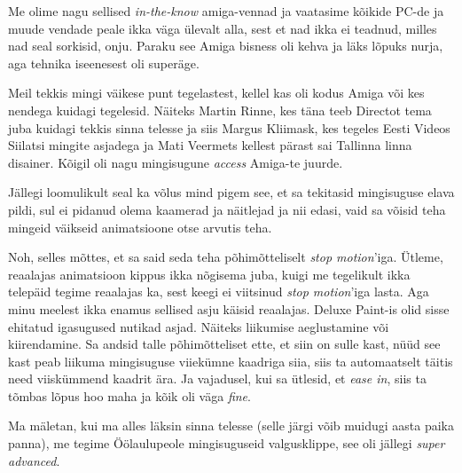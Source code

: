 Me olime nagu sellised \emph{in-the-know} amiga-vennad ja vaatasime  kõikide 
PC-de  ja muude vendade peale ikka väga ülevalt alla, sest et nad ikka ei 
teadnud, milles nad seal sorkisid, onju. Paraku see Amiga bisness oli kehva ja 
läks lõpuks nurja, aga tehnika iseenesest oli superäge. 

Meil tekkis mingi väikese punt tegelastest, kellel kas oli kodus Amiga või kes 
nendega kuidagi tegelesid. Näiteks Martin Rinne, kes 
täna teeb Directot tema juba kuidagi tekkis  sinna telesse ja 
siis Margus Kliimask, kes tegeles Eesti 
Videos Siilatsi mingite asjadega ja Mati 
Veermets kellest pärast sai Tallinna linna disainer. 
 Kõigil oli nagu mingisugune \emph{access} Amiga-te juurde. 

Jällegi loomulikult seal ka võlus mind pigem see, et sa tekitasid mingisuguse 
elava pildi, sul ei  pidanud olema kaamerad ja näitlejad ja nii edasi, vaid sa 
võisid teha mingeid väikseid animatsioone otse arvutis teha.


Noh, selles mõttes, et sa said seda teha põhimõtteliselt \emph{stop 
motion}'iga. Ütleme,  reaalajas animatsioon kippus ikka nõgisema juba, kuigi me 
tegelikult ikka telepäid tegime reaalajas ka, sest keegi ei viitsinud 
\emph{stop motion}'iga lasta. Aga minu meelest ikka enamus sellised asju käisid 
reaalajas. Deluxe Paint-is olid sisse ehitatud igasugused 
nutikad asjad. Näiteks  liikumise aeglustamine või kiirendamine. Sa andsid 
talle põhimõtteliset ette, et siin on sulle kast, nüüd see kast peab liikuma 
mingisuguse viiekümne kaadriga siia, siis ta automaatselt täitis need 
viiskümmend kaadrit ära. Ja vajadusel, kui sa ütlesid, et \emph{ease in}, siis 
ta tõmbas lõpus hoo maha ja kõik oli väga \emph{fine}.  

Ma mäletan, kui ma alles läksin sinna telesse (selle järgi võib muidugi aasta 
paika panna), me tegime Öölaulupeole  
mingisuguseid valgusklippe, see oli jällegi \emph{super advanced}.


